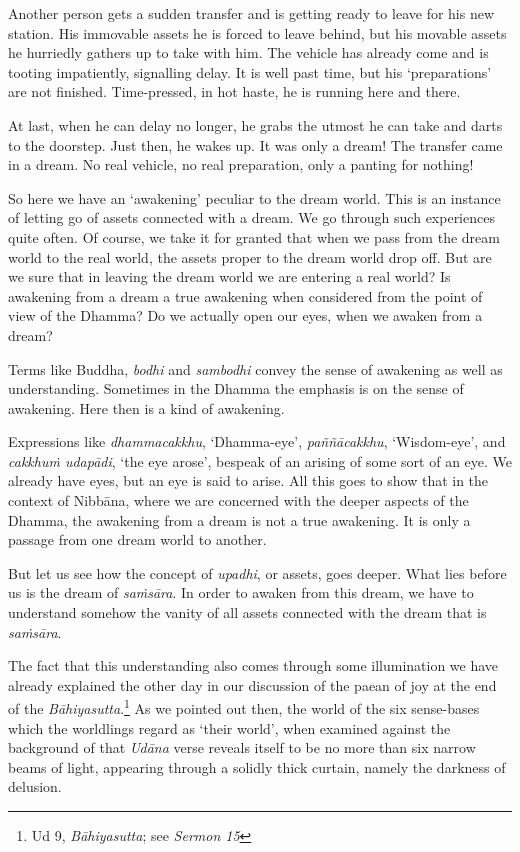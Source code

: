 Another person gets a sudden transfer and is getting ready to leave for his new station. His immovable assets he is forced to leave behind, but his movable assets he hurriedly gathers up to take with him. The vehicle has already come and is tooting impatiently, signalling delay. It is well past time, but his `preparations' are not finished. Time-pressed, in hot haste, he is running here and there.

At last, when he can delay no longer, he grabs the utmost he can take and darts to the doorstep. Just then, he wakes up. It was only a dream! The transfer came in a dream. No real vehicle, no real preparation, only a panting for nothing!

So here we have an `awakening' peculiar to the dream world. This is an instance of letting go of assets connected with a dream. We go through such experiences quite often. Of course, we take it for granted that when we pass from the dream world to the real world, the assets proper to the dream world drop off. But are we sure that in leaving the dream world we are entering a real world? Is awakening from a dream a true awakening when considered from the point of view of the Dhamma? Do we actually open our eyes, when we awaken from a dream?

Terms like Buddha, \emph{bodhi} and \emph{sambodhi} convey the sense of awakening as well as understanding. Sometimes in the Dhamma the emphasis is on the sense of awakening. Here then is a kind of awakening.

Expressions like \emph{dhammacakkhu}, `Dhamma-eye', \emph{paññācakkhu}, `Wisdom-eye', and \emph{cakkhuṁ udapādi}, `the eye arose', bespeak of an arising of some sort of an eye. We already have eyes, but an eye is said to arise. All this goes to show that in the context of Nibbāna, where we are concerned with the deeper aspects of the Dhamma, the awakening from a dream is not a true awakening. It is only a passage from one dream world to another.

But let us see how the concept of \emph{upadhi}, or assets, goes deeper. What lies before us is the dream of \emph{saṁsāra}. In order to awaken from this dream, we have to understand somehow the vanity of all assets connected with the dream that is \emph{saṁsāra}.

The fact that this understanding also comes through some illumination we have already explained the other day in our discussion of the paean of joy at the end of the \emph{Bāhiyasutta}.\footnote{Ud 9, \emph{Bāhiyasutta}; see \emph{Sermon 15}} As we pointed out then, the world of the six sense-bases which the worldlings regard as `their world', when examined against the background of that \emph{Udāna} verse reveals itself to be no more than six narrow beams of light, appearing through a solidly thick curtain, namely the darkness of delusion.

